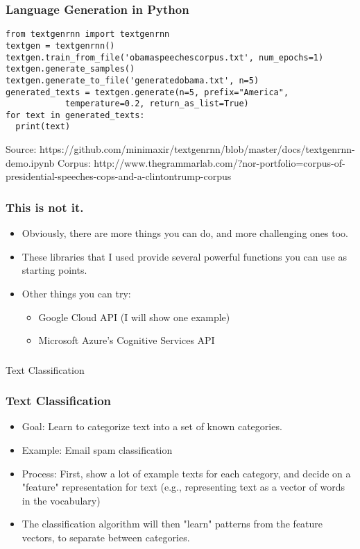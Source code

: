 \documentclass{beamer}
\begin{document}
\begin{frame}[fragile]
\frametitle{Language Generation in Python}
\small
\begin{verbatim}
from textgenrnn import textgenrnn
textgen = textgenrnn()
textgen.train_from_file('obamaspeechescorpus.txt', num_epochs=1)
textgen.generate_samples()
textgen.generate_to_file('generatedobama.txt', n=5)
generated_texts = textgen.generate(n=5, prefix="America", 
			temperature=0.2, return_as_list=True)
for text in generated_texts:
  print(text)
\end{verbatim}

\tiny
Source: https://github.com/minimaxir/textgenrnn/blob/master/docs/textgenrnn-demo.ipynb
Corpus: http://www.thegrammarlab.com/?nor-portfolio=corpus-of-presidential-speeches-cops-and-a-clintontrump-corpus
\end{frame}


\begin{frame}
\frametitle{This is not it.}
\begin{itemize}
\item Obviously, there are more things you can do, and more challenging ones too.
\item These libraries that I used provide several powerful functions you can use as starting points. 
\item Other things you can try:
\begin{itemize}
\item Google Cloud API (I will show one example)
\item Microsoft Azure's Cognitive Services API
\end{itemize}
\end{itemize}
\end{frame}

\begin{frame}
\frametitle{}
\Large Text Classification
\end{frame}

\begin{frame}
\frametitle{Text Classification}
\begin{itemize}
\item Goal: Learn to categorize text into a set of known categories.
\item Example: Email spam classification
\item Process: First, show a lot of example texts for each category, and decide on a "feature" representation for text (e.g., representing text as a vector of words in the vocabulary)
\item The classification algorithm will then "learn" patterns from the feature vectors, to separate between categories.
\end{itemize}
\end{frame}
\end{document}
